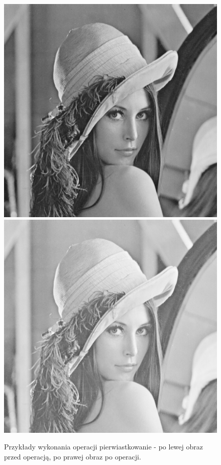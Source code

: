 \documentclass{article}
\begin{document}
\begin{figure}[!htb]
\includegraphics[scale=0.2]{img/lena_8bit.png}
\includegraphics[scale=0.2]{img/_Pierwiastkowanie_Obrazu_lena_8bit.png} 
\caption{Przykłady wykonania operacji pierwiastkowanie - po lewej obraz przed operacją, po prawej obraz po operacji. }
\end{figure}
\end{document}
